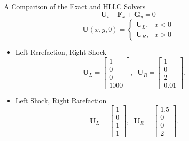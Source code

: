 \documentclass{beamer}
\newcommand{\mbf}{\mathbf}
\newcommand{\bq}{\begin{equation}}
\newcommand{\eq}{\end{equation}}
\begin{document}
\begin{frame}{A Comparison of the Exact and HLLC Solvers}
$$\mbf{U}_t+\mbf{F}_x+\mbf{G}_y=0$$
$$\mbf{U}(x,y,0)=\left\{\begin{array}{cc}\mbf{U}_L,&x<0\\ \mbf{U}_R,&x>0\end{array}\right.$$

\begin{itemize}
\item Left Rarefaction, Right Shock
\bq \mbf{U}_L=\left[\begin{array}{c}1\\ 0\\ 0\\ 1000\end{array}\right],\;\; \mbf{U}_R=\left[\begin{array}{c}1\\ 0 \\2\\ 0.01\end{array}\right].\eq
\item Left Shock, Right Rarefaction
\bq \mbf{U}_L=\left[\begin{array}{c}1\\0\\1\\1\end{array}\right],\;\; \mbf{U}_R=\left[\begin{array}{c}1.5\\ 0 \\ 0\\2\end{array}\right].\eq
\end{itemize}
\end{frame}
\end{document}
